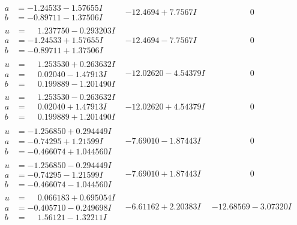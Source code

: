 \documentclass[1p]{elsarticle_modified}
\theoremstyle{definition}
\begin{document}
$$\begin{array}{c|c|c}
\begin{aligned}
a &= -1.24533 - 1.57655 I \\
b &= -0.89711 - 1.37506 I\end{aligned}
 & -12.4694 + 7.7567 I & \phantom{-0.000000 } 0 \\ \hline\begin{aligned}
u &= \phantom{-}1.237750 - 0.293203 I \\
a &= -1.24533 + 1.57655 I \\
b &= -0.89711 + 1.37506 I\end{aligned}
 & -12.4694 - 7.7567 I & \phantom{-0.000000 } 0 \\ \hline\begin{aligned}
u &= \phantom{-}1.253530 + 0.263632 I \\
a &= \phantom{-}0.02040 - 1.47913 I \\
b &= \phantom{-}0.199889 - 1.201490 I\end{aligned}
 & -12.02620 - 4.54379 I & \phantom{-0.000000 } 0 \\ \hline\begin{aligned}
u &= \phantom{-}1.253530 - 0.263632 I \\
a &= \phantom{-}0.02040 + 1.47913 I \\
b &= \phantom{-}0.199889 + 1.201490 I\end{aligned}
 & -12.02620 + 4.54379 I & \phantom{-0.000000 } 0 \\ \hline\begin{aligned}
u &= -1.256850 + 0.294449 I \\
a &= -0.74295 + 1.21599 I \\
b &= -0.466074 + 1.044560 I\end{aligned}
 & -7.69010 - 1.87443 I & \phantom{-0.000000 } 0 \\ \hline\begin{aligned}
u &= -1.256850 - 0.294449 I \\
a &= -0.74295 - 1.21599 I \\
b &= -0.466074 - 1.044560 I\end{aligned}
 & -7.69010 + 1.87443 I & \phantom{-0.000000 } 0 \\ \hline\begin{aligned}
u &= \phantom{-}0.066183 + 0.695054 I \\
a &= -0.405710 - 0.249698 I \\
b &= \phantom{-}1.56121 - 1.32211 I\end{aligned}
 & -6.61162 + 2.20383 I & -12.68569 - 3.07320 I \\ \hline\begin{aligned}

\end{aligned}
\end{array}$$
\end{document}
